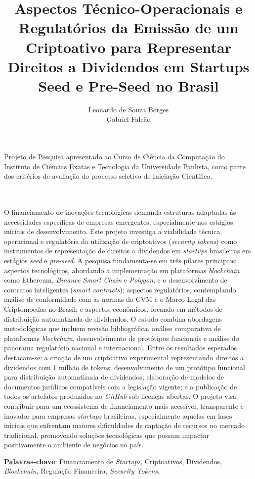 \documentclass[12pt, a4paper, oneside, openright, chapter=TITLE]{abntex2}
\title{
    Aspectos Técnico-Operacionais e Regulatórios da Emissão de um Criptoativo para Representar Direitos a Dividendos em Startups Seed e Pre-Seed no Brasil \\
    \vspace{0.5cm}
}
\author{Leonardo de Souza Borges \\ Gabriel Falcão}
\renewcommand{\imprimirfolhaderosto}{%
    \begin{titlepage}
        \begin{center}
            {\ABNTEXchapterfont\large\imprimirinstituicao\par}
            \vspace{4cm}

            {\ABNTEXchapterfont\bfseries\Large\imprimirtitulo\par}
            \vspace{3cm}
        \end{center}

        \begin{flushright}
            \begin{minipage}{0.5\textwidth}
                \small
                Projeto de Pesquisa apresentado ao Curso de Ciência da Computação do Instituto de Ciências Exatas e Tecnologia da Universidade Paulista, como parte dos critérios de avaliação do processo seletivo de Iniciação Científica.
                \\
                \imprimirorientadorRotulo
                \\
                ~\imprimirorientador
            \end{minipage}
        \end{flushright}

        \vspace{2cm}

        \begin{center}
            {\ABNTEXchapterfont\large\imprimirautor\par}
            \vspace{2cm}

            {\ABNTEXchapterfont\large\imprimirlocal\par}
            {\ABNTEXchapterfont\large\imprimirdata\par}
        \end{center}
    \end{titlepage}
}
\begin{document}
\setcounter{page}{1}

\imprimirfolhaderosto
%

\clearpage
\begin{resumo}
\vspace{1cm}
O financiamento de inovações tecnológicas demanda estruturas adaptadas às necessidades específicas de empresas emergentes, especialmente nos estágios iniciais de desenvolvimento. Este projeto investiga a viabilidade técnica, operacional e regulatória da utilização de criptoativos (\textit{security tokens}) como instrumentos de representação de direitos a dividendos em \textit{startups} brasileiras em estágios \textit{seed} e \textit{pre-seed}. A pesquisa fundamenta-se em três pilares principais: aspectos tecnológicos, abordando a implementação em plataformas \textit{blockchain} como Ethereum, \textit{Binance Smart Chain} e \textit{Polygon}, e o desenvolvimento de contratos inteligentes (\textit{smart contracts}); aspectos regulatórios, contemplando análise de conformidade com as normas da CVM e o Marco Legal das Criptomoedas no Brasil; e aspectos econômicos, focando em métodos de distribuição automatizada de dividendos. O estudo combina abordagens metodológicas que incluem revisão bibliográfica, análise comparativa de plataformas \textit{blockchain}, desenvolvimento de protótipos funcionais e análise do panorama regulatório nacional e internacional. Entre os resultados esperados destacam-se: a criação de um criptoativo experimental representando direitos a dividendos com 1 milhão de tokens; desenvolvimento de um protótipo funcional para distribuição automatizada de dividendos; elaboração de modelos de documentos jurídicos compatíveis com a legislação vigente; e a publicação de todos os artefatos produzidos no \textit{GitHub} sob licenças abertas. O projeto visa contribuir para um ecossistema de financiamento mais acessível, transparente e inovador para empresas \textit{startups} brasileiras, especialmente aquelas em fases iniciais que enfrentam maiores dificuldades de captação de recursos no mercado tradicional, promovendo soluções tecnológicas que possam impactar positivamente o ambiente de negócios no país.


\textbf{Palavras-chave}: Financiamento de \textit{Startups}, Criptoativos, Dividendos, \textit{Blockchain}, Regulação Financeira, \textit{Security Tokens}.
\end{resumo}

\clearpage
{}
\begin{samepage}
\begingroup
\setlength{\parskip}{0pt}
\tableofcontents*
\endgroup
\end{samepage}
\clearpage
\end{document}
